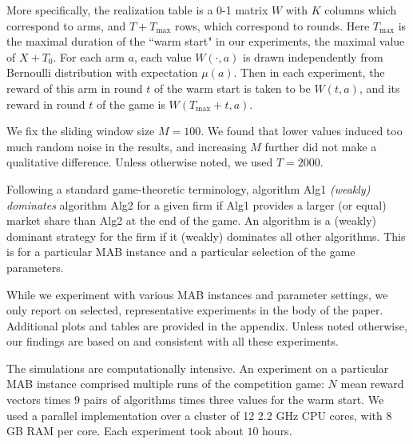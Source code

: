 \documentclass[../competing_bandits.tex]{subfiles}
\begin{document}
More specifically, the realization table is a 0-1 matrix $W$ with $K$ columns which correspond to arms, and $T+T_{\max}$ rows, which correspond to rounds. Here $T_{\max}$ is the maximal duration of the ``warm start" in our experiments, \ie the maximal value of $X+T_0$. For each arm $a$, each value $W(\cdot,a)$ is drawn independently from Bernoulli distribution with expectation $\mu(a)$. Then in each experiment, the reward of this arm in round $t$ of the warm start is taken to be $W(t,a)$, and its reward in round $t$ of the game is $W(T_{\max}+t,a)$.

We fix the sliding window size $M = 100$. We found that lower values induced too much random noise in the results, and increasing $M$ further did not make a qualitative difference. Unless otherwise noted, we used $T = 2000$.

Following a standard game-theoretic terminology, algorithm Alg1 \emph{(weakly) dominates} algorithm Alg2 for a given firm if Alg1 provides a larger (or equal) market share than Alg2 at the end of the game. An algorithm is a (weakly) dominant strategy for the firm if it (weakly) dominates all other algorithms. This is for a particular MAB instance and a particular selection of the game parameters.

While we experiment with various MAB instances and parameter settings, we only report on selected, representative experiments in the body of the paper. Additional plots and tables are provided in the appendix. Unless noted otherwise, our findings are based on and consistent with all these experiments.


The simulations are computationally intensive. An experiment on a particular MAB instance comprised multiple runs of the competition game: $N$ mean reward vectors times $9$ pairs of algorithms times three values for the warm start. We used a parallel implementation over a cluster of 12 2.2 GHz CPU cores, with 8 GB RAM per core. Each experiment took about $10$ hours.
\end{document}
